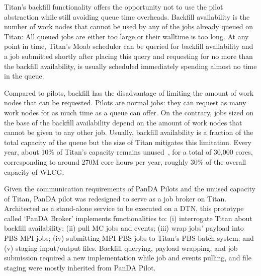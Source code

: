 Titan's backfill functionality offers the opportunity not to use the pilot
abstraction while still avoiding queue time overheads. Backfill availability is
the number of work nodes that cannot be used by any of the jobs already queued
on Titan: All queued jobs are either too large or their walltime is too long. At
any point in time, Titan's Moab scheduler can be queried for backfill
availability and a job submitted shortly after placing this query and requesting
for no more than the backfill availability, is usually scheduled immediately
spending almost no time in the queue.

Compared to pilots, backfill has the disadvantage of limiting the amount of work
nodes that can be requested. Pilots are normal jobs: they can request as many
work nodes for as much time as a queue can offer. On the contrary, jobs sized on
the base of the backfill availability depend on the amount of work nodes that
cannot be given to any other job. Usually, backfill availability is a fraction
of the total capacity of the queue but the size of Titan mitigates this
limitation. Every year, about 10\% of Titan's capacity remains
unused~\cite{titan_utilization}, for a total of 30,000 cores, corresponding to
around 270M core hours per year, roughly 30\% of the overall capacity of WLCG.



Given the communication requirements of PanDA Pilots and the unused capacity of
Titan, PanDA pilot was redesigned to serve as a job broker on Titan. Architected
as a stand-alone service to be executed on a DTN, this prototype called `PanDA
Broker' implements functionalities to: (i) interrogate Titan about backfill
availability; (ii) pull MC jobs and events; (iii) wrap jobs' payload into PBS
MPI jobs; (iv) submitting MPI PBS jobs to Titan's PBS batch system; and (v)
staging input/output files. Backfill querying, payload wrapping, and job
submission required a new implementation while job and events pulling, and file
staging were mostly inherited from PanDA Pilot.

